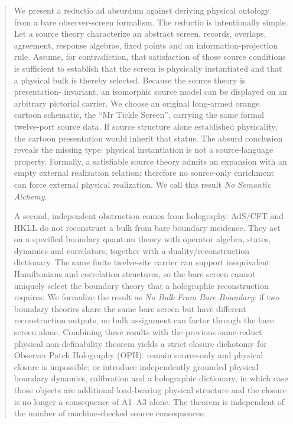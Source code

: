 \documentclass[10pt,a4paper]{article}
\theoremstyle{definition}
\theoremstyle{remark}
\begin{document}
\begin{abstract}
We present a reductio ad absurdum against deriving physical ontology from a
bare observer-screen formalism.  The reductio is intentionally simple.  Let a
source theory characterize an abstract screen, records, overlaps, agreement,
response algebras, fixed points and an information-projection rule.  Assume,
for contradiction, that satisfaction of those source conditions is sufficient
to establish that the screen is physically instantiated and that a physical
bulk is thereby selected.  Because the source theory is presentation-
invariant, an isomorphic source model can be displayed on an arbitrary
pictorial carrier.  We choose an original long-armed orange cartoon schematic,
the ``Mr Tickle Screen'', carrying the same formal twelve-port source data.  If
source structure alone established physicality, the cartoon presentation
would inherit that status.  The absurd conclusion reveals the missing type:
physical instantiation is not a source-language property.  Formally, a
satisfiable source theory admits an expansion with an empty external
realization relation; therefore no source-only enrichment can force external
physical realization.  We call this result \emph{No Semantic Alchemy}.

A second, independent obstruction comes from holography.  AdS/CFT and HKLL do
not reconstruct a bulk from bare boundary incidence.  They act on a specified
boundary quantum theory with operator algebra, states, dynamics and
correlators, together with a duality/reconstruction dictionary.  The same
finite twelve-site carrier can support inequivalent Hamiltonians and
correlation structures, so the bare screen cannot uniquely select the
boundary theory that a holographic reconstruction requires.  We formalize the
result as \emph{No Bulk From Bare Boundary}: if two boundary theories share the
same bare screen but have different reconstruction outputs, no bulk assignment
can factor through the bare screen alone.  Combining these results with the
previous same-reduct physical non-definability theorem yields a strict closure
dichotomy for Observer Patch Holography (OPH): remain source-only and physical
closure is impossible; or introduce independently grounded physical boundary
dynamics, calibration and a holographic dictionary, in which case those
objects are additional load-bearing physical structure and the closure is no
longer a consequence of A1--A3 alone.  The theorem is independent of the
number of machine-checked source consequences.
\end{abstract}
\end{document}
